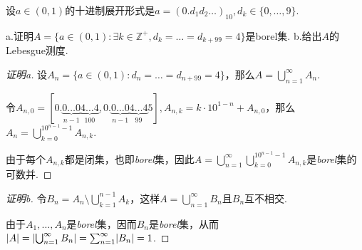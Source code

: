 \begin{comment}
    设\(A \in \mathcal{L}\)且\(\abs*{A}<\infty\).于是存在闭集\(F \subseteq A\)使得\(\abs*{A \setminus F}<\varepsilon\).

    因而\(\abs*{A}=\abs*{F}+\abs*{A \setminus F}, \abs*{F}=\abs*{A}-\varepsilon\).由于\(\varepsilon\)任意，故\(\abs*{A}_*=\sup \abs*{F} \geq \abs*{A}\).

    由于\(F \subseteq A\)，故\(\abs*{A}_* \leq \abs*{A}\)恒成立，结合之得到\(\abs*{A}_*=\abs*{A}\)，即\(A \in \mathcal{L}\).

    考虑\(\abs*{A}=\infty\)，令\(A_k=A \cap (-k,k), A=\bigcup_{k=1}^\infty A_k\).\(\forall N>0, \exists k \in \mathbb{Z}^+, \abs*{A_k}>N+1\).

    显然\(A_k\)是有界集，则存在有界闭集\(F\)使得\(\abs*{A_k}-\abs*{F}<1\).

    从而\(\abs*{A}_* \geq \abs*{F}>\abs*{A_k}-1>(N+1)-1=N\)，故\(\abs*{A}=\infty=\abs*{A}_*\)，即\(A \in \mathcal{N}\).
\end{proof}
\end{comment}

\newpage

\begin{problem}[1]\label{2.D.1}
    设\(a \in (0,1)\)的十进制展开形式是\(a=(0.d_1d_2 \dots)_{10}, d_k \in \{0, \dots,9\}\).

    a.证明\(A=\{a \in (0,1): \exists k \in \mathbb{Z}^+, d_k=\dots=d_{k+99}=4\}\)是borel集. \enspace b.给出\(A\)的Lebesgue测度.
\end{problem}

\begin{proof}[证明a]
    设\(A_n=\{a \in (0,1): d_n=\dots=d_{n+99}=4\}\)，那么\(A=\bigcup_{n=1}^\infty A_n\).

    令\(A_{n,0}=[0.\underbrace{0 \dots 0}_{n-1} \underbrace{4 \dots 4}_{100}, 0.\underbrace{0 \dots 0}_{n-1} \underbrace{4 \dots 4}_{99} 5], A_{n,k}=k \cdot 10^{1-n}+A_{n,0}\)，那么\(A_n=\bigcup_{k=0}^{10^{n-1}-1} A_{n,k}\).

    由于每个\(A_{n,k}\)都是闭集，也即\textit{borel}集，因此\(A=\bigcup_{n=1}^\infty \bigcup_{k=0}^{10^{n-1}-1} A_{n,k}\)是\textit{borel}集的可数并.
\end{proof}

\begin{proof}[证明b]
    令\(B_n=A_n \setminus \bigcup_{k=1}^{n-1} A_k\)，这样\(A=\bigcup_{n=1}^\infty B_n\)且\(B_n\)互不相交.

    由于\(A_1, \dots, A_n\)是\textit{borel}集，因而\(B_n\)是\textit{borel}集，从而\(\abs*{A}=\abs*{\bigcup_{n=1}^\infty B_n}=\sum_{n=1}^\infty \abs*{B_n}=1\).
\end{proof}

